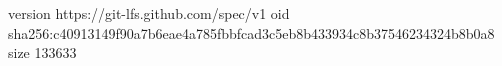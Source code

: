 version https://git-lfs.github.com/spec/v1
oid sha256:c40913149f90a7b6eae4a785fbbfcad3c5eb8b433934c8b37546234324b8b0a8
size 133633
